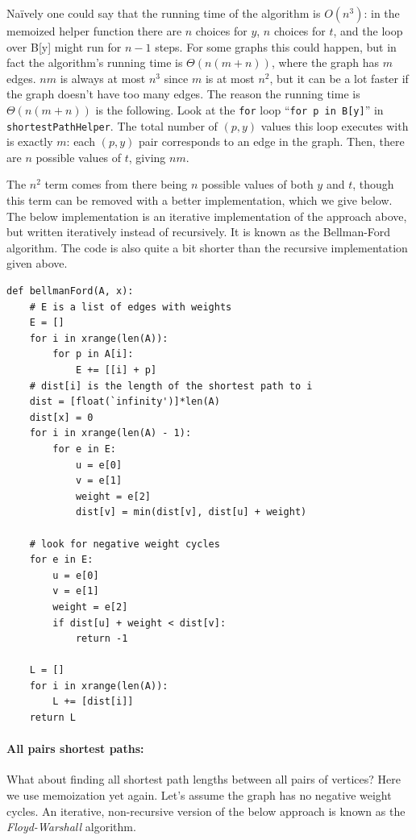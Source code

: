 \documentclass[11pt]{article}
\begin{document}
Na\"{i}vely one could say that the running time of the algorithm is
$O(n^3)$: in the memoized helper function there are $n$ choices for
$y$, $n$ choices for $t$, and the loop over B[y] might run for $n-1$
steps.  For some graphs this could happen, but in fact the algorithm's
running time is $\Theta(n(m+n))$, where the graph has $m$ edges.
$nm$ is
always at most $n^3$ since $m$ is at most $n^2$, but it can be a lot
faster if the graph doesn't have too many edges.  The reason the
running time is $\Theta(n(m+n))$ is the following.  
Look at the \texttt{for} loop ``\texttt{for p in B[y]}'' in
\texttt{shortestPathHelper}.  The total number of $(p,y)$ values this
loop executes with is exactly $m$: each $(p,y)$ pair corresponds to an
edge in the graph.  Then, there are $n$ possible values of $t$, giving
$nm$.  

The $n^2$ term comes from there being $n$ possible values of
both $y$ and $t$, though this term can be removed with a better
implementation, which we give below. The below implementation is an
iterative implementation of the approach above, but written 
iteratively instead of recursively.  It is known as the Bellman-Ford
algorithm.  The code is also quite a bit shorter than the recursive
implementation given above.

\newpage

\begin{verbatim}
def bellmanFord(A, x):
    # E is a list of edges with weights
    E = []
    for i in xrange(len(A)):
        for p in A[i]:
            E += [[i] + p]
    # dist[i] is the length of the shortest path to i
    dist = [float(`infinity')]*len(A)
    dist[x] = 0
    for i in xrange(len(A) - 1):
        for e in E:
            u = e[0]
            v = e[1]
            weight = e[2]
            dist[v] = min(dist[v], dist[u] + weight)

    # look for negative weight cycles
    for e in E:
        u = e[0]
        v = e[1]
        weight = e[2]
        if dist[u] + weight < dist[v]:
            return -1

    L = []
    for i in xrange(len(A)):
        L += [dist[i]]
    return L
\end{verbatim}

\paragraph{\Large All pairs shortest paths:}
What about finding all shortest path lengths between all pairs of
vertices?  Here we use memoization yet again.  
Let's assume the graph has no negative weight cycles.
An iterative, non-recursive version of
the below approach is known as the {\em Floyd-Warshall} algorithm. 
\end{document}

